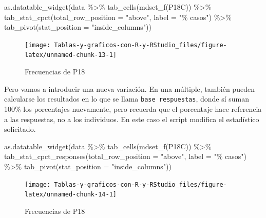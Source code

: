 \documentclass[
]{book}
\newenvironment{Shaded}{\begin{snugshade}}{\end{snugshade}}
\newcommand{\AttributeTok}[1]{\textcolor[rgb]{0.77,0.63,0.00}{#1}}
\newcommand{\FunctionTok}[1]{\textcolor[rgb]{0.00,0.00,0.00}{#1}}
\newcommand{\NormalTok}[1]{#1}
\newcommand{\SpecialCharTok}[1]{\textcolor[rgb]{0.00,0.00,0.00}{#1}}
\newcommand{\StringTok}[1]{\textcolor[rgb]{0.31,0.60,0.02}{#1}}
\begin{document}
\begin{Shaded}
\begin{Highlighting}[]
\FunctionTok{as.datatable\_widget}\NormalTok{(data }\SpecialCharTok{\%\textgreater{}\%}
  \FunctionTok{tab\_cells}\NormalTok{(}\FunctionTok{mdset\_f}\NormalTok{(P18C)) }\SpecialCharTok{\%\textgreater{}\%}
  \FunctionTok{tab\_stat\_cpct}\NormalTok{(}\AttributeTok{total\_row\_position =} \StringTok{"above"}\NormalTok{, }\AttributeTok{label =} \StringTok{"\% casos"}\NormalTok{) }\SpecialCharTok{\%\textgreater{}\%}
  \FunctionTok{tab\_pivot}\NormalTok{(}\AttributeTok{stat\_position =} \StringTok{"inside\_columns"}\NormalTok{))}
\end{Highlighting}
\end{Shaded}

\begin{figure}[H]

{\centering \texttt{[image: Tablas-y-graficos-con-R-y-RStudio\_files/figure-latex/unnamed-chunk-13-1]} 

}

\caption{Frecuencias de P18}\label{fig:unnamed-chunk-13}
\end{figure}

Pero vamos a introducir una nueva variación. En una múltiple, también pueden calcularse los resultados en lo que se llama \texttt{base\ respuestas}, donde sí suman 100\% los porcentajes nuevamente, pero recuerda que el porcentaje hace referencia a las respuestas, no a los individuos. En este caso el script modifica el estadístico solicitado.

\begin{Shaded}
\begin{Highlighting}[]
\FunctionTok{as.datatable\_widget}\NormalTok{(data }\SpecialCharTok{\%\textgreater{}\%}
  \FunctionTok{tab\_cells}\NormalTok{(}\FunctionTok{mdset\_f}\NormalTok{(P18C)) }\SpecialCharTok{\%\textgreater{}\%}
  \FunctionTok{tab\_stat\_cpct\_responses}\NormalTok{(}\AttributeTok{total\_row\_position =} \StringTok{"above"}\NormalTok{,}
    \AttributeTok{label =} \StringTok{"\% casos"}\NormalTok{) }\SpecialCharTok{\%\textgreater{}\%}
  \FunctionTok{tab\_pivot}\NormalTok{(}\AttributeTok{stat\_position =} \StringTok{"inside\_columns"}\NormalTok{))}
\end{Highlighting}
\end{Shaded}

\begin{figure}[H]

{\centering \texttt{[image: Tablas-y-graficos-con-R-y-RStudio\_files/figure-latex/unnamed-chunk-14-1]} 

}

\caption{Frecuencias de P18}\label{fig:unnamed-chunk-14}
\end{figure}
\end{document}
